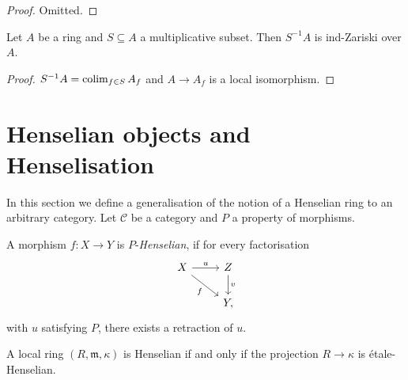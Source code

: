 \begin{proof}
  Omitted.
\end{proof}

\begin{lemma}
    \label{lemma:ind-Zariski-localization}
    Let $A$ be a ring and $S \subseteq A$ a multiplicative subset. Then $S^{-1}A$ is ind-Zariski over $A$.
    \leanok
\end{lemma}

\begin{proof}
    \leanok
    $S^{-1} A = \operatorname{colim}_{f \in S} A_f$ and $A \to A_f$ is a local isomorphism.
\end{proof}

\section{Henselian objects and Henselisation}

In this section we define a generalisation of the notion of a Henselian ring to an arbitrary category. Let $\mathcal{C}$ be a category
and $P$ a property of morphisms.

\begin{definition}[Henselian]
    A morphism $f\colon X \to Y$ is $P$-\emph{Henselian}, if for every factorisation
    \[
    \begin{tikzcd}
        X \arrow{r}{u} \arrow[swap]{dr}{f} & Z \arrow{d}{v} \\
                    & Y,
    \end{tikzcd}
    \] with $u$ satisfying $P$, there exists a retraction of $u$.
    \label{def:p-henselian}
\end{definition}

\begin{example}
    A local ring $(R, \mathfrak{m}, \kappa)$ is Henselian if and only if the projection $R \to \kappa$ is étale-Henselian.
\end{example}

